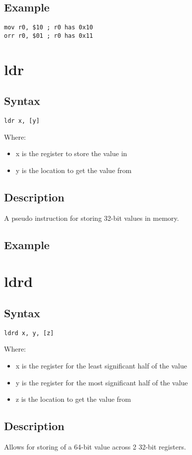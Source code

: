 \documentclass[11pt]{scrartcl}
\begin{document}
\subsection{Example}
\begin{verbatim}
mov r0, $10 ; r0 has 0x10
orr r0, $01 ; r0 has 0x11
\end{verbatim}

\section{ldr}
\subsection{Syntax}
\begin{verbatim}
ldr x, [y]
\end{verbatim}
Where:
\begin{itemize}
    \item x is the register to store the value in
    \item y is the location to get the value from
\end{itemize}
\subsection{Description}
A pseudo instruction for storing 32-bit values in memory.
\subsection{Example}

\section{ldrd}
\subsection{Syntax}
\begin{verbatim}
ldrd x, y, [z]
\end{verbatim}
Where:
\begin{itemize}
    \item x is the register for the least significant half of the value
    \item y is the register for the most significant half of the value
    \item z is the location to get the value from
\end{itemize}
\subsection{Description}
Allows for storing of a 64-bit value across 2 32-bit registers.
\end{document}
